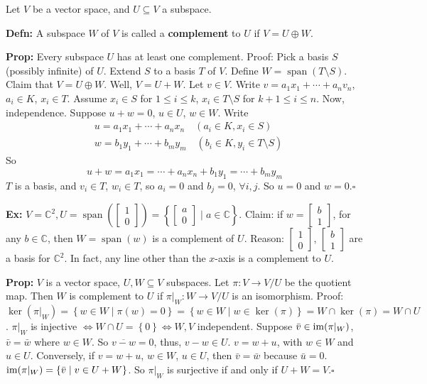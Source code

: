 \documentclass[10pt,letterpaper]{article}
\newcommand{\n}{\hfill\break}
\newcommand{\hangblock}[2]{\par\noindent\settowidth{\hangindent}{\textbf{#1: }}\textbf{#1: }\!\!\!#2}
\newcommand{\defn}[1]{\hangblock{Defn}{#1}}
\newcommand{\prop}[1]{\hangblock{Prop}{#1}}
\newcommand{\ex}[1]{\hangblock{Ex}{#1}}
\newcommand{\proven}{\;$\square$\n}
\newcommand{\set}[1]{\left\{#1\right\}}
\newcommand{\complex}{\mathbb{C}}
\newcommand{\C}{\complex}
\newcommand{\cut}{\setminus}
\newcommand{\im}{\textrm{\textnormal{im}}}
\DeclareMathOperator{\vspan}{span}
\newcommand{\smallBMatrix}[1]{\brack{\begin{smallmatrix}#1\end{smallmatrix}}}
\newcommand{\paren}[1]{\left(#1\right)}
\renewcommand{\brack}[1]{\left[#1\right]}
\begin{document}
\par\noindent
Let $V$ be a vector space, and $U\subseteq{}V$ a subspace.\n

\defn{
	A subspace $W$ of $V$ is called a \textbf{complement} to $U$ if $V=U\oplus{}W$.\n
}

\prop{
	Every subspace $U$ has at least one complement.\n
	Proof: Pick a basis $S$ (possibly infinite) of $U$. Extend $S$ to a basis $T$ of $V$. Define $W=\vspan(T\cut{}S)$. Claim that $V=U\oplus{}W$.\n
	Well, $V=U+W$. Let $v\in{}V$. Write $v=a_{1}x_{1}+\cdots+a_{n}v_{n}$, $a_{i}\in{}K$, $x_{i}\in{}T$. Assume $x_{i}\in{}S$ for $1\le{}i\le{}k$, $x_{i}\in{}T\cut{}S$ for $k+1\le{}i\le{}n$.\n
	Now, independence. Suppose $u+w=0$, $u\in{}U$, $w\in{}W$. Write
	\begin{align*}
		& u=a_{1}x_{1}+\cdots+a_{n}x_{n}\quad(a_{i}\in{}K,x_{i}\in{}S)\\
		& w=b_{1}y_{1}+\cdots+b_{m}y_{m}\quad(b_{i}\in{}K,y_{i}\in{}T\cut{}S)
	\end{align*}
	So
	\[
		u+w=a_{1}x_{1}=\cdots+a_{n}x_{n}+b_{1}y_{1}=\cdots+b_{m}y_{m}
	\]
	$T$ is a basis, and $v_{i}\in{}T$, $w_{i}\in{}T$, so $a_{i}=0$ and $b_{j}=0$, $\forall{}i,j$. So $u=0$ and $w=0$.\proven
}

\ex{
	$V=\C^{2},U=\vspan\paren{\smallBMatrix{1\\ 0}}=\set{\smallBMatrix{a\\ 0}\mid{}a\in\C}$.\n
	Claim: if $w=\smallBMatrix{b\\ 1}$, for any $b\in\C$, then $W=\vspan(w)$ is a complement of $U$.\n
	Reason: $\smallBMatrix{1\\ 0}$, $\smallBMatrix{b\\ 1}$ are a basis for $\C^{2}$.\n
	\n
	In fact, any line other than the $x$-axis is a complement to $U$.\n
}

\prop{
	$V$ is a vector space, $U,W\subseteq{}V$ subspaces. Let $\pi:V\to{}V/U$ be the quotient map. Then $W$ is complement to $U$ if $\pi|_{W}:W\to{}V/U$ is an isomorphism.\n
	Proof: $\ker(\pi|_{W})=\set{w\in{}W\mid\pi(w)=0}=\set{w\in{}W\mid{}w\in\ker(\pi)}=W\cap\ker(\pi)=W\cap{}U$.\n
	$\pi|_{W}$ is injective $\Leftrightarrow{}W\cap{}U=\set{0}\Leftrightarrow{}W,V$ independent.\n
	\n
	Suppose $\bar{v}\in\im(\pi|_{W})$, $\bar{v}=\bar{w}$ where $w\in{}W$. So $\overline{v-w}=0$, thus, $v-w\in{}U$. $v=w+u$, with $w\in{}W$ and $u\in{}U$. Conversely, if $v=w+u$, $w\in{}W$, $u\in{}U$, then $\bar{v}=\bar{w}$ because $\bar{u}=0$.\n
	\n
	$\im(\pi|_{W})=\set{\bar{v}\mid{}v\in{}U+W}$. So $\pi|_{W}$ is surjective if and only if $U+W=V$.\proven
}
\end{document}
